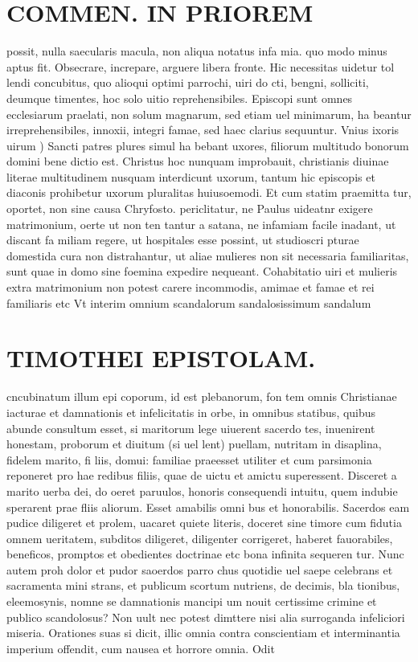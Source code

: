 \documentclass{article}
\begin{document}
\begin{pages}
\section*{COMMEN. IN PRIOREM }
\marginpar{[ p.66 ]}\pstart possit, nulla saecularis macula, non aliqua notatus infa mia. quo modo minus aptus fit. Obsecrare, increpare, arguere libera fronte. Hic necessitas uidetur tol lendi concubitus, quo alioqui optimi parrochi, uiri do cti, bengni, solliciti, deumque timentes, hoc solo uitio reprehensibiles. Episcopi sunt omnes ecclesiarum praelati, non solum magnarum, sed etiam uel minimarum, ha beantur irreprehensibiles, innoxii, integri famae, sed haec clarius sequuntur.  \pend\pstart Vnius ixoris uirum ) Sancti patres plures simul ha bebant uxores, filiorum multitudo bonorum domini bene dictio est. Christus hoc nunquam improbauit, christianis diuinae literae multitudinem nusquam interdicunt uxorum, tantum hic episcopis et diaconis prohibetur uxorum pluralitas huiusoemodi. Et cum statim praemitta tur, oportet, non sine causa Chryfosto. periclitatur, ne Paulus uideatnr exigere matrimonium, oerte ut non ten tantur a satana, ne infamiam facile inadant, ut discant fa miliam regere, ut hospitales esse possint, ut studioscri pturae domestida cura non distrahantur, ut aliae mulieres non sit necessaria familiaritas, sunt quae in domo sine foemina expedire nequeant. Cohabitatio uiri et mulieris extra matrimonium non potest carere incommodis, amimae et famae et rei familiaris etc Vt interim omnium scandalorum sandalosissimum sandalum  \pend
\section*{TIMOTHEI EPISTOLAM. }
\marginpar{[ p.67 ]}\pstart cncubinatum illum epi coporum, id est plebanorum, fon tem omnis Christianae iacturae et damnationis et infelicitatis in orbe, in omnibus statibus, quibus abunde consultum esset, si maritorum lege uiuerent sacerdo tes, inuenirent honestam, proborum et diuitum (si uel lent) puellam, nutritam in disaplina, fidelem marito, fi liis, domui: familiae praeesset utiliter et cum parsimonia reponeret pro hae redibus filiis, quae de uictu et amictu superessent. Disceret a marito uerba dei, do oeret paruulos, honoris consequendi intuitu, quem indubie sperarent prae fliis aliorum. Esset amabilis omni bus et honorabilis. Sacerdos eam pudice diligeret et prolem, uacaret quiete literis, doceret sine timore cum fidutia omnem ueritatem, subditos diligeret, diligenter corrigeret, haberet fauorabiles, beneficos, promptos et obedientes doctrinae etc bona infinita sequeren tur. Nunc autem proh dolor et pudor saoerdos parro chus quotidie uel saepe celebrans et sacramenta mini strans, et publicum scortum nutriens, de decimis, bla tionibus, eleemosynis, nomne se damnationis mancipi um nouit certissime crimine et publico scandolosus? Non uult nec potest dimttere nisi alia surroganda infeliciori miseria. Orationes suas si dicit, illic omnia contra conscientiam et interminantia imperium offendit, cum nausea et horrore omnia. Odit  \pend

\end{pages}
\end{document}
